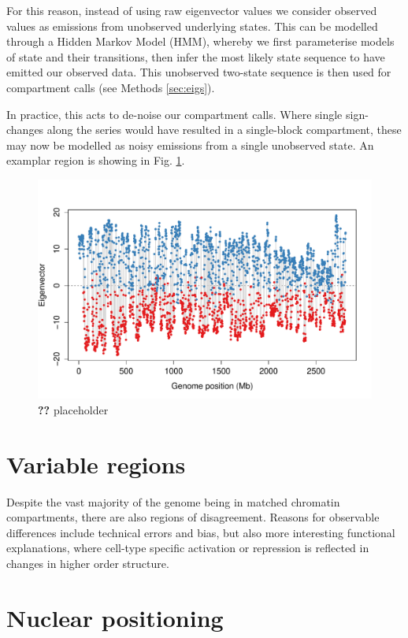 \documentclass[a4paper,10pt,oneside]{book}
\begin{document}
For this reason, instead of using raw eigenvector values we consider observed values as emissions from unobserved underlying states. This can be modelled through a Hidden Markov Model (HMM), whereby we first parameterise models of state and their transitions, then infer the most likely state sequence to have emitted our observed data. This unobserved two-state sequence is then used for compartment calls (see Methods \ref{sec:eigs}). 

In practice, this acts to de-noise our compartment calls. Where single sign-changes along the series would have resulted in a single-block compartment, these may now be modelled as noisy emissions from a single unobserved state. An examplar region is showing in Fig. \ref{fig:denoise}.

\begin{figure}
\begin{center}
\includegraphics[width=.9\textwidth]{figs/hmm_denoise.pdf}
\captionsetup{width=\textwidth}
\caption{
{\bf ??}
placeholder 
}\label{fig:denoise}
\end{center}
\end{figure} 


\section{Variable regions}

Despite the vast majority of the genome being in matched chromatin compartments, there are also regions of disagreement. Reasons for observable differences include technical errors and bias, but also more interesting functional explanations, where cell-type specific activation or repression is reflected in changes in higher order structure.









\section{Nuclear positioning}



\ifstandalone
\begin{small}

\end{small}
\fi
\end{document}

